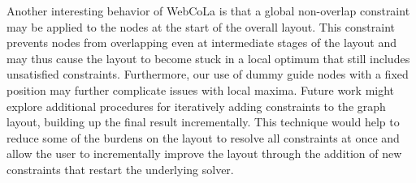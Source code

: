 Another interesting behavior of WebCoLa is that a global non-overlap constraint
may be applied to the nodes at the start of the overall layout. This constraint
prevents nodes from overlapping even at intermediate stages of the layout and
may thus cause the layout to become stuck in a local optimum that still
includes unsatisfied constraints. Furthermore, our use of
dummy guide nodes with a fixed position may further complicate issues
with local maxima. Future work might explore additional procedures for
iteratively adding constraints to the graph layout, building up the final
result incrementally. This technique would help to reduce some of the burdens
on the layout to resolve all constraints at once and allow the user to
incrementally improve the layout through the addition of new constraints
that restart the underlying solver.
